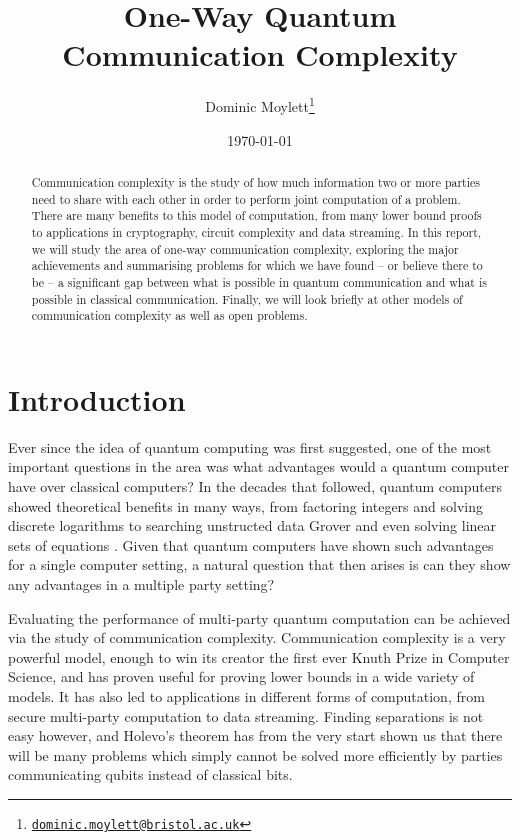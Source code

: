 \documentclass[a4paper]{article}
\begin{document}
    \title{One-Way Quantum Communication Complexity}
    \author{Dominic Moylett\thanks{\texttt{\href{dominic.moylett@bristol.ac.uk}{dominic.moylett@bristol.ac.uk}}}}
    \date{\today}
    \maketitle

    \begin{abstract}
        Communication complexity is the study of how much information two or more parties need to share with each other in order to perform joint computation of a problem. There are many benefits to this model of computation, from many lower bound proofs to applications in cryptography, circuit complexity and data streaming. In this report, we will study the area of one-way communication complexity, exploring the major achievements and summarising problems for which we have found -- or believe there to be -- a significant gap between what is possible in quantum communication and what is possible in classical communication. Finally, we will look briefly at other models of communication complexity as well as open problems.
    \end{abstract}

    \section{Introduction}

        Ever since the idea of quantum computing was first suggested, one of the most important questions in the area was what advantages would a quantum computer have over classical computers? In the decades that followed, quantum computers showed theoretical benefits in many ways, from factoring integers and solving discrete logarithms \cite{Shor:1997:PAP:264393.264406} to searching unstructed data Grover \cite{Grover:1996:FQM:237814.237866} and even solving linear sets of equations \cite{PhysRevLett.103.150502}. Given that quantum computers have shown such advantages for a single computer setting, a natural question that then arises is can they show any advantages in a multiple party setting?

        Evaluating the performance of multi-party quantum computation can be achieved via the study of communication complexity. Communication complexity is a very powerful model, enough to win its creator the first ever Knuth Prize in Computer Science, and has proven useful for proving lower bounds in a wide variety of models. It has also led to applications in different forms of computation, from secure multi-party computation to data streaming. Finding separations is not easy however, and Holevo's theorem has from the very start shown us that there will be many problems which simply cannot be solved more efficiently by parties communicating qubits instead of classical bits.
\end{document}
